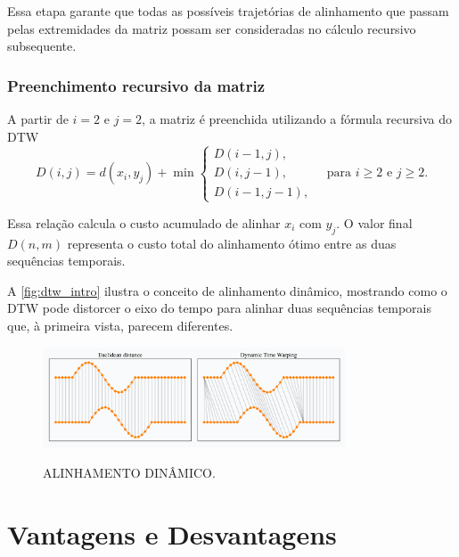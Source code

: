 Essa etapa garante que todas as possíveis trajetórias de alinhamento que passam pelas extremidades da matriz possam ser consideradas no cálculo recursivo subsequente.

\subsubsection*{Preenchimento recursivo da matriz}

A partir de \(i = 2\) e \(j = 2\), a matriz é preenchida utilizando a fórmula recursiva do DTW
\begin{equation}
    D(i, j) = d(x_i, y_j) + \min \begin{cases}
        D(i-1, j), \\
        D(i, j-1), \\
        D(i-1, j-1),
    \end{cases}
    \quad \text{para } i \geq 2 \text{ e } j \geq 2.
\end{equation}

Essa relação calcula o custo acumulado de alinhar \(x_i\) com \(y_j\). O valor final \(D(n, m)\) representa o custo total do alinhamento ótimo entre as duas sequências temporais.


A \autoref{fig:dtw_intro} ilustra o conceito de alinhamento dinâmico, mostrando como o DTW pode distorcer o eixo do tempo para alinhar duas sequências temporais que, à primeira vista, parecem diferentes.

\begin{figure}[h!]
    \centering
    \caption{ALINHAMENTO DINÂMICO.}
    \includegraphics[width=0.8\textwidth]{fig/dtw_vs_euc.png}
    \label{fig:dtw_intro}
\end{figure}

\section{Vantagens e Desvantagens}

